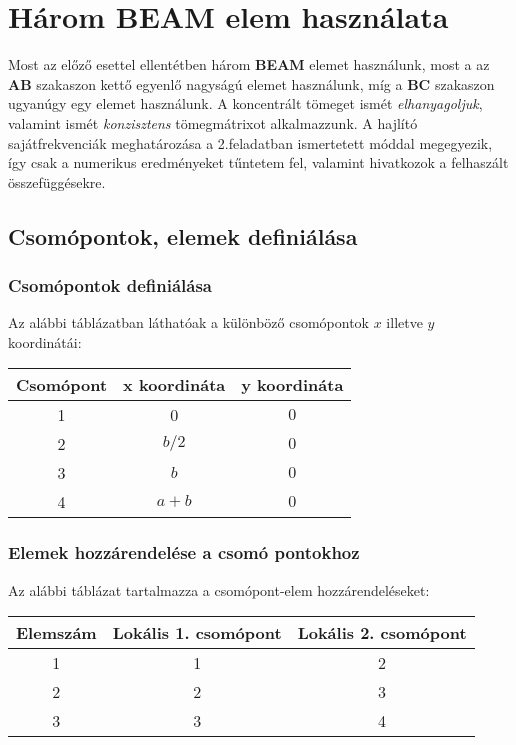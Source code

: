 \documentclass[12pt,a4paper]{article}
\begin{document}
\section{Három BEAM elem használata}
Most az előző esettel ellentétben három \textbf{BEAM} elemet használunk, most a
az \textbf{AB} szakaszon kettő egyenlő nagyságú elemet használunk, míg a \textbf{BC}
szakaszon ugyanúgy egy elemet használunk. A koncentrált tömeget ismét \textit{elhanyagoljuk},
valamint ismét \textit{konzisztens} tömegmátrixot alkalmazzunk. A hajlító sajátfrekvenciák
meghatározása a 2.feladatban ismertetett móddal megegyezik, így csak a numerikus eredményeket
tűntetem fel, valamint hivatkozok a felhaszált összefüggésekre.
\subsection{Csomópontok, elemek definiálása}
\subsubsection{Csomópontok definiálása}
Az alábbi táblázatban láthatóak a különböző csomópontok $x$ illetve
$y$ koordinátái:
\begin{center}
    \begin{tabular}{|c|c|c|}
        \hline
        Csomópont & x koordináta & y koordináta \\
        \hline
        \hline
        1         & 0            & $0$          \\
        \hline
        2         & $b/2$        & $0$          \\
        \hline
        3         & $b$          & $0$          \\
        \hline
        4         & $a+b$        & $0$          \\
        \hline
    \end{tabular}
\end{center}

\subsubsection{Elemek hozzárendelése a csomó pontokhoz}
Az alábbi táblázat tartalmazza a csomópont-elem hozzárendeléseket:
\begin{center}
    \begin{tabular}{|c|c|c|}
        \hline
        Elemszám & Lokális 1. csomópont & Lokális 2. csomópont \\
        \hline
        \hline
        1        & 1                    & 2                    \\
        \hline
        2        & 2                    & 3                    \\
        \hline
        3        & 3                    & 4                    \\
        \hline
    \end{tabular}
\end{center}
\end{document}
